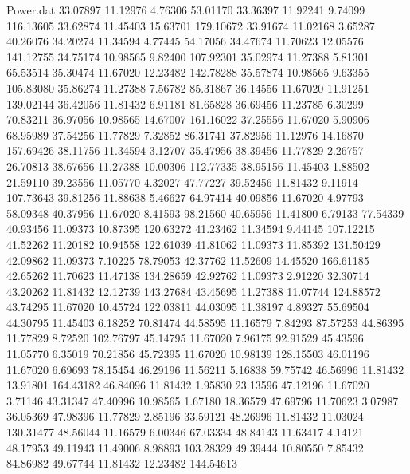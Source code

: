 \begin{filecontents}{Power.dat}
  33.07897   11.12976    4.76306   53.01170
  33.36397   11.92241    9.74099  116.13605
  33.62874   11.45403   15.63701  179.10672
  33.91674   11.02168    3.65287   40.26076
  34.20274   11.34594    4.77445   54.17056
  34.47674   11.70623   12.05576  141.12755
  34.75174   10.98565    9.82400  107.92301
  35.02974   11.27388    5.81301   65.53514
  35.30474   11.67020   12.23482  142.78288
  35.57874   10.98565    9.63355  105.83080
  35.86274   11.27388    7.56782   85.31867
  36.14556   11.67020   11.91251  139.02144
  36.42056   11.81432    6.91181   81.65828
  36.69456   11.23785    6.30299   70.83211
  36.97056   10.98565   14.67007  161.16022
  37.25556   11.67020    5.90906   68.95989
  37.54256   11.77829    7.32852   86.31741
  37.82956   11.12976   14.16870  157.69426
  38.11756   11.34594    3.12707   35.47956
  38.39456   11.77829    2.26757   26.70813
  38.67656   11.27388   10.00306  112.77335
  38.95156   11.45403    1.88502   21.59110
  39.23556   11.05770    4.32027   47.77227
  39.52456   11.81432    9.11914  107.73643
  39.81256   11.88638    5.46627   64.97414
  40.09856   11.67020    4.97793   58.09348
  40.37956   11.67020    8.41593   98.21560
  40.65956   11.41800    6.79133   77.54339
  40.93456   11.09373   10.87395  120.63272
  41.23462   11.34594    9.44145  107.12215
  41.52262   11.20182   10.94558  122.61039
  41.81062   11.09373   11.85392  131.50429
  42.09862   11.09373    7.10225   78.79053
  42.37762   11.52609   14.45520  166.61185
  42.65262   11.70623   11.47138  134.28659
  42.92762   11.09373    2.91220   32.30714
  43.20262   11.81432   12.12739  143.27684
  43.45695   11.27388   11.07744  124.88572
  43.74295   11.67020   10.45724  122.03811
  44.03095   11.38197    4.89327   55.69504
  44.30795   11.45403    6.18252   70.81474
  44.58595   11.16579    7.84293   87.57253
  44.86395   11.77829    8.72520  102.76797
  45.14795   11.67020    7.96175   92.91529
  45.43596   11.05770    6.35019   70.21856
  45.72395   11.67020   10.98139  128.15503
  46.01196   11.67020    6.69693   78.15454
  46.29196   11.56211    5.16838   59.75742
  46.56996   11.81432   13.91801  164.43182
  46.84096   11.81432    1.95830   23.13596
  47.12196   11.67020    3.71146   43.31347
  47.40996   10.98565    1.67180   18.36579
  47.69796   11.70623    3.07987   36.05369
  47.98396   11.77829    2.85196   33.59121
  48.26996   11.81432   11.03024  130.31477
  48.56044   11.16579    6.00346   67.03334
  48.84143   11.63417    4.14121   48.17953
  49.11943   11.49006    8.98893  103.28329
  49.39444   10.80550    7.85432   84.86982
  49.67744   11.81432   12.23482  144.54613

\end{filecontents}
